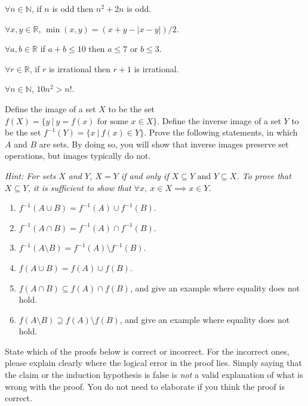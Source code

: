 
\begin{Parts}
	\Part $\forall n \in \mathbb{N}$, if $n$ is odd then $n^2 + 2n$ is odd.
	
    \Part $\forall x, y \in \mathbb{R}$, $\min(x, y) = (x + y - |x - y|)/2$.

	\Part $\forall a, b \in \mathbb{R}$ if $a + b \le 10$ then $a \le 7$ or $b \le 3$.

	\Part $\forall r \in \mathbb{R}$, if $r$ is irrational then $r + 1$ is irrational.

	\Part $\forall n \in \mathbb{N}$, $10n^2 > n!$.
\end{Parts}



Define the image of a set $X$ to be the set $f(X) = \{y~|~y = f(x) \text{ for some } x \in X\}$. Define the inverse image of a set $Y$ to be the set $f^{-1}(Y) = \{x~|~f(x) \in Y\}$. Prove the following statements, in which $A$ and $B$ are sets. By doing so, you will show that inverse images preserve set operations, but images typically do not.

\textit{Hint: For sets $X$ and $Y$, $X=Y$ if and only if $X \subseteq Y \text{ and } Y \subseteq X$. To prove that $X \subseteq Y$, it is sufficient to show that $\forall x,~x \in X \implies x \in Y$.}

\begin{enumerate}
    \item $f^{-1}(A \cup B) = f^{-1}(A) \cup f^{-1}(B)$.
    \item $f^{-1}(A \cap B) = f^{-1}(A) \cap f^{-1}(B)$.
    \item $f^{-1}(A \setminus B) = f^{-1}(A) \setminus f^{-1}(B)$.
    \item $f(A \cup B) = f(A) \cup f(B)$.
    \item $f(A \cap B) \subseteq f(A) \cap f(B)$, and give an example where equality does not hold.
    \item $f(A \setminus B) \supseteq f(A) \setminus f(B)$, and give an example where equality does not hold.
\end{enumerate}



State which of the proofs below is correct or incorrect.
For the incorrect ones, please explain clearly where the logical error in the proof lies.
Simply saying that the claim or the induction hypothesis is false is \emph{not} a valid explanation of what is wrong with the proof.
You do not need to elaborate if you think the proof is correct.

